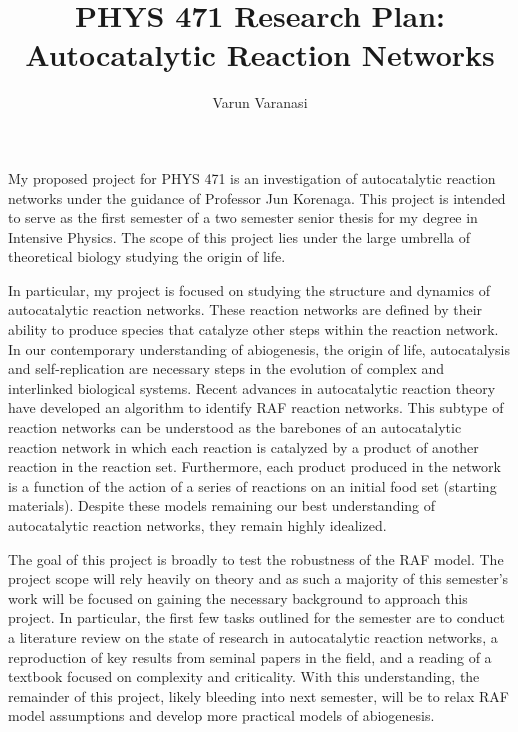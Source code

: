 \documentclass{article}
\title{PHYS 471 Research Plan: Autocatalytic Reaction Networks}
\author{Varun Varanasi}
\begin{document}
\maketitle

My proposed project for PHYS 471 is an investigation of autocatalytic reaction networks under the guidance of Professor Jun Korenaga. This project is intended to serve as the first semester of a two semester senior thesis for my degree in Intensive Physics. The scope of this project lies under the large umbrella of theoretical biology studying the origin of life. 

In particular, my project is focused on studying the structure and dynamics of autocatalytic reaction networks. These reaction networks are defined by their ability to produce species that catalyze other steps within the reaction network. In our contemporary understanding of abiogenesis, the origin of life, autocatalysis and self-replication are necessary steps in the evolution of complex and interlinked biological systems. Recent advances in autocatalytic reaction theory have developed an algorithm to identify RAF reaction networks. This subtype of reaction networks can be understood as the barebones of an autocatalytic reaction network in which each reaction is catalyzed by a product of another reaction in the reaction set. Furthermore, each product produced in the network is a function of the action of a series of reactions on an initial food set (starting materials). Despite these models remaining our best understanding of autocatalytic reaction networks, they remain highly idealized. 

The goal of this project is broadly to test the robustness of the RAF model. The project scope will rely heavily on theory and as such a majority of this semester's work will be focused on gaining the necessary background to approach this project. In particular, the first few tasks outlined for the semester are to conduct a literature review on the state of research in autocatalytic reaction networks, a reproduction of key results from seminal papers in the field, and a reading of a textbook focused on complexity and criticality. With this understanding, the remainder of this project, likely bleeding into next semester, will be to relax RAF model assumptions and develop more practical models of abiogenesis. 
\end{document}
